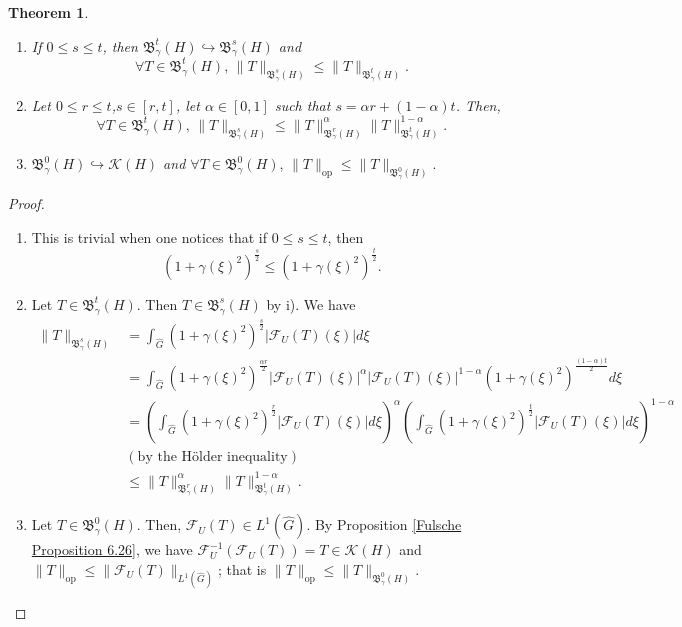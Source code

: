 \documentclass[11pt,a4paper]{amsart}
\newtheorem{theorem}{Theorem}[section]
\begin{document}
\begin{theorem}\label{continuous embedding}
\begin{enumerate}
\item[i)] If $0\leq s\leq t$, then $\mathfrak{B}^t_\gamma(H)\hookrightarrow \mathfrak{B}^s_\gamma(H)$ and 
$$\forall T\in \mathfrak{B}^t_\gamma(H),\, \|T\|_{\mathfrak{B}^s_\gamma(H)}\leq \|T\|_{\mathfrak{B}^t_\gamma(H)}.$$

\item[ii)] Let $0\leq r\leq t$,$s\in [r,t]$, let $\alpha \in [0,1]$ such that   $s=\alpha r + (1-\alpha)t$. Then,
$$\forall
T\in \mathfrak{B}^{t}_\gamma (H),\, \|T\|_{\mathfrak{B}^{s}_\gamma (H)}\leq \|T\|_{\mathfrak{B}^{r}_\gamma (H)}^\alpha \|T\|_{\mathfrak{B}^{t}_\gamma (H)}^{1-\alpha}.$$
\item[iii)] $\mathfrak{B}^0_\gamma(H)\hookrightarrow \mathcal{K}(H)$ and 
$\forall T\in  \mathfrak{B}^0_\gamma(H),\,\|T\|_{\mbox{op}}\leq \|T\|_{\mathfrak{B}^0_\gamma(H)}.$
\end{enumerate}
\end{theorem}

\begin{proof}
\begin{enumerate}
\item[i)] This is trivial when one notices that if $0\leq s\leq t$, then 
$$(1+\gamma(\xi)^2)^{\frac{s}{2}}\leq (1+\gamma(\xi)^2)^{\frac{t}{2}}.$$
\item[ii)] Let $T\in \mathfrak{B}^t_\gamma(H)$. Then $T\in \mathfrak{B}^s_\gamma(H)$ by i). We have 
\begin{align*}
\|T\|_{\mathfrak{B}^s_\gamma(H)}&=\int_{\widehat{G}}(1+\gamma(\xi)^2)^{\frac{s}{2}}|\mathcal{F}_U(T)(\xi)|d\xi\\
&=\int_{\widehat{G}}(1+\gamma(\xi)^2)^{\frac{\alpha r}{2}}|\mathcal{F}_U(T)(\xi)|^\alpha |\mathcal{F}_U(T)(\xi)|^{1-\alpha} (1+\gamma(\xi)^2)^{\frac{(1-\alpha)t}{2}}d\xi\\
&=\left(\int_{\widehat{G}}(1+\gamma(\xi)^2)^{\frac{r}{2}}|\mathcal{F}_U(T)(\xi)| d\xi\right)^\alpha \left(\int_{\widehat{G}}(1+\gamma(\xi)^2)^{\frac{t}{2}}|\mathcal{F}_U(T)(\xi)| d\xi\right)^{1-\alpha}     \\
&(\mbox{by the H\"older inequality})\\
&\leq \|T\|_{\mathfrak{B}^r_\gamma(H)}^\alpha \|T\|_{\mathfrak{B}^t_\gamma(H)}^{1-\alpha}.
\end{align*}
\item[iii)] Let $T\in \mathfrak{B}^0_\gamma (H)$. Then, $\mathcal{F}_U(T)\in L^1(\widehat{G})$. By Proposition \ref{Fulsche Proposition 6.26}, we have 
$\mathcal{F}_U^{-1}(\mathcal{F}_U(T))=T\in \mathcal{K}(H)$ and $\|T\|_{\mbox{op}}\leq \|\mathcal{F}_U(T)\|_{L^1(\widehat{G})}$; that is $\|T\|_{\mbox{op}}\leq \|T\|_{\mathfrak{B}^0_\gamma(H)}$.
\end{enumerate}
\end{proof}
\end{document}
